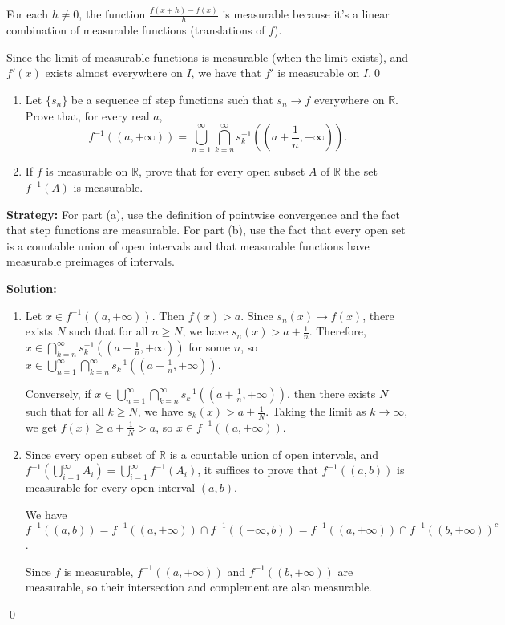For each $h \neq 0$, the function $\frac{f(x + h) - f(x)}{h}$ is measurable because it's a linear combination of measurable functions (translations of $f$).

Since the limit of measurable functions is measurable (when the limit exists), and $f'(x)$ exists almost everywhere on $I$, we have that $f'$ is measurable on $I$.\qed


\begin{problembox}
\begin{problemstatement}
\begin{enumerate}[label=(\alph*)]
\item Let $\{s_n\}$ be a sequence of step functions such that $s_n \to f$ everywhere on $\mathbb{R}$. Prove that, for every real $a$,
\[f^{-1}((a, +\infty)) = \bigcup_{n=1}^\infty \bigcap_{k=n}^\infty s_k^{-1} \left( \left( a + \frac{1}{n}, +\infty \right) \right).\]
\item If $f$ is measurable on $\mathbb{R}$, prove that for every open subset $A$ of $\mathbb{R}$ the set $f^{-1}(A)$ is measurable.
\end{enumerate}
\end{problemstatement}
\end{problembox}

\noindent\textbf{Strategy:} For part (a), use the definition of pointwise convergence and the fact that step functions are measurable. For part (b), use the fact that every open set is a countable union of open intervals and that measurable functions have measurable preimages of intervals.

\bigskip\noindent\textbf{Solution:}
\begin{enumerate}[label=(\alph*)]
\item Let $x \in f^{-1}((a, +\infty))$. Then $f(x) > a$. Since $s_n(x) \to f(x)$, there exists $N$ such that for all $n \geq N$, we have $s_n(x) > a + \frac{1}{n}$. Therefore, $x \in \bigcap_{k=n}^\infty s_k^{-1}((a + \frac{1}{n}, +\infty))$ for some $n$, so $x \in \bigcup_{n=1}^\infty \bigcap_{k=n}^\infty s_k^{-1}((a + \frac{1}{n}, +\infty))$.

Conversely, if $x \in \bigcup_{n=1}^\infty \bigcap_{k=n}^\infty s_k^{-1}((a + \frac{1}{n}, +\infty))$, then there exists $N$ such that for all $k \geq N$, we have $s_k(x) > a + \frac{1}{N}$. Taking the limit as $k \to \infty$, we get $f(x) \geq a + \frac{1}{N} > a$, so $x \in f^{-1}((a, +\infty))$.

\item Since every open subset of $\mathbb{R}$ is a countable union of open intervals, and $f^{-1}(\bigcup_{i=1}^{\infty} A_i) = \bigcup_{i=1}^{\infty} f^{-1}(A_i)$, it suffices to prove that $f^{-1}((a, b))$ is measurable for every open interval $(a, b)$.

We have $f^{-1}((a, b)) = f^{-1}((a, +\infty)) \cap f^{-1}((-\infty, b)) = f^{-1}((a, +\infty)) \cap f^{-1}((b, +\infty))^c$.

Since $f$ is measurable, $f^{-1}((a, +\infty))$ and $f^{-1}((b, +\infty))$ are measurable, so their intersection and complement are also measurable.
\end{enumerate}\qed


